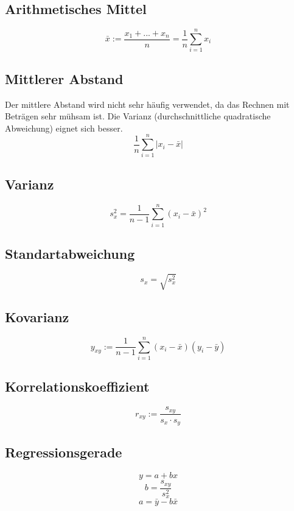 \documentclass[12pt]{article}
\begin{document}
\subsection{Arithmetisches Mittel}
\begin{equation*}
	\bar{x} := \frac{x_1 + ... + x_n}{n} = \frac{1}{n}\sum_{i=1}^{n}{x_i}
\end{equation*}
\subsection{Mittlerer Abstand}
Der mittlere Abstand wird nicht sehr häufig verwendet, da das Rechnen mit Beträgen sehr mühsam ist. Die Varianz (durchschnittliche quadratische Abweichung) eignet sich besser.
\begin{equation*}
	\frac{1}{n}\sum_{i=1}^{n}{|x_i-\bar{x}|}
\end{equation*}
\subsection{Varianz}
\begin{equation*}
	s_x^2= \frac{1}{n-1}\sum_{i=1}^n{(x_i-\bar{x})^2}
\end{equation*}
\subsection{Standartabweichung}
\begin{equation*}
	s_x = \sqrt{s_x^2}
\end{equation*}
\subsection{Kovarianz}
\begin{equation*}
	y_{xy}:=\frac{1}{n-1}\sum_{i=1}^n(x_i-\bar{x})(y_i-\bar{y})
\end{equation*}
\subsection{Korrelationskoeffizient}
\begin{equation*}
	r_{xy}:=\frac{s_{xy}}{s_x\cdot s_y}
\end{equation*}
\subsection{Regressionsgerade}
\begin{equation*}
	y = a + bx
\end{equation*}
\begin{equation*}
	b = \frac{s_{xy}}{s_x^2}
\end{equation*}
\begin{equation*}
	a = \bar{y} - b\bar{x}
\end{equation*}
\end{document}
